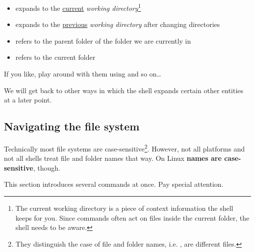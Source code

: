 \documentclass{olli-handout}
\begin{document}
\begin{itemize}
	\item \TTQ{{\mytilde}+} expands to the \underline{current} \emph{working directory}\footnote{The current working directory is a piece of context information the shell keeps for you. Since commands often act on files inside the current folder, the shell needs to be aware.}
	\item \TTQ{{\mytilde}-} expands to the \underline{previous} \emph{working directory} after changing directories
	\item {} refers to the parent folder of the folder we are currently in
	\item {} refers to the current folder
\end{itemize}

If you like, play around with them using  and so on\ldots

{\olliHandLeft} We will get back to other ways in which the shell expands certain other entities at a later point.

\subsection{Navigating the file system}

Technically most file systems are case-sensitive\footnote{They distinguish the case of file and folder names, i.e. ,  are different files.}. However, not all platforms and not all shells treat file and folder names that way. On Linux \textbf{names are case-sensitive}, though.

{\olliHandLeft} This section introduces several commands at once. Pay special attention.
\end{document}
